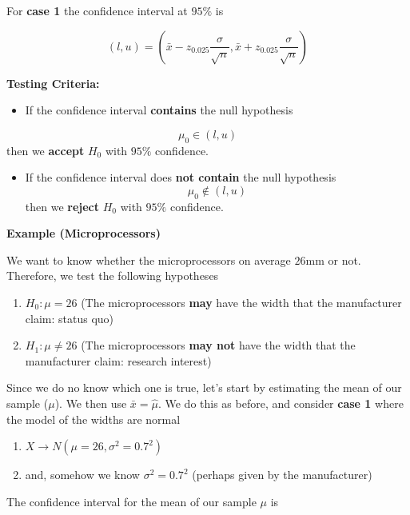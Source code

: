 \documentclass[
]{book}
\providecommand{\tightlist}{%
  \setlength{\itemsep}{0pt}\setlength{\parskip}{0pt}}
\begin{document}
For \textbf{case 1} the confidence interval at \(95\%\) is

\[(l,u)=(\bar{x}-z_{0.025} \frac{\sigma}{\sqrt{n}}, \bar{x}+z_{0.025} \frac{\sigma}{\sqrt{n}})\]

\textbf{Testing Criteria:}

\begin{itemize}
\tightlist
\item
  If the confidence interval \textbf{contains} the null hypothesis
\end{itemize}

\[\mu_0\in (l,u)\] then we \textbf{accept} \(H_0\) with \(95\%\) confidence.

\begin{itemize}
\tightlist
\item
  If the confidence interval does \textbf{not contain} the null hypothesis\[\mu_0\notin (l,u)\] then we \textbf{reject} \(H_0\) with \(95\%\) confidence.
\end{itemize}

\textbf{Example (Microprocessors)}

We want to know whether the microprocessors on average \(26\)mm or not. Therefore, we test the following hypotheses

\begin{enumerate}
\def\labelenumi{\alph{enumi}.}
\tightlist
\item
  \(H_0:\mu = 26\) (The microprocessors \textbf{may} have the width that the manufacturer claim: status quo)
\item
  \(H_1:\mu \neq 26\) (The microprocessors \textbf{may not} have the width that the manufacturer claim: research interest)
\end{enumerate}

Since we do no know which one is true, let's start by estimating the mean of our sample (\(\mu\)). We then use \(\bar{x}=\hat{\mu}\). We do this as before, and consider \textbf{case 1} where the model of the widths are normal

\begin{enumerate}
\def\labelenumi{\arabic{enumi}.}
\tightlist
\item
  \(X \rightarrow N(\mu=26, \sigma^2=0.7^2)\)
\item
  and, somehow we know \(\sigma^2=0.7^2\) (perhaps given by the manufacturer)
\end{enumerate}

The confidence interval for the mean of our sample \(\mu\) is
\end{document}
